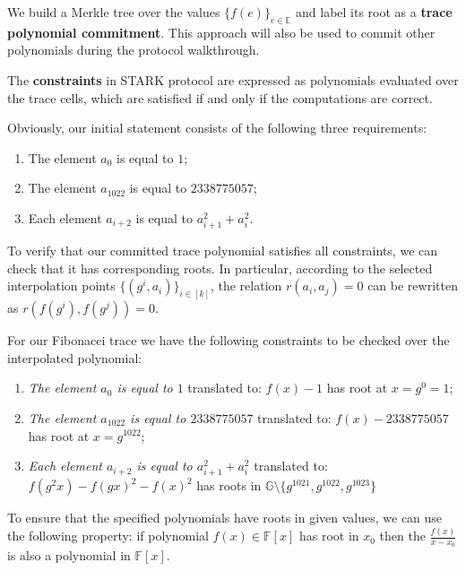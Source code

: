 \documentclass[../lecture-notes.tex]{subfiles}
\begin{document}
We build a Merkle tree over the values $\{f(e)\}_{e \in \mathbb{E}}$ and label
its root as a \textbf{trace polynomial commitment}. This approach will also be
used to commit other polynomials during the protocol walkthrough.

The \textbf{constraints} in STARK protocol are expressed as polynomials
evaluated over the trace cells, which are satisfied if and only if the
computations are correct.

\begin{example}
Obviously, our initial statement consists of the following three requirements:
\begin{enumerate}
    \item The element $a_0$ is equal to $1$;
    \item The element $a_{1022}$ is equal to $2338775057$;
    \item Each element $a_{i+2}$ is equal to $a_{i+1}^2 + a_{i}^2$.
\end{enumerate}
\end{example}
To verify that our committed trace polynomial satisfies all constraints, we can
check that it has corresponding roots. In particular, according to the selected
interpolation points $\{(g^i, a_i)\}_{i \in [k]}$, the relation $r(a_i, a_j) =
0$ can be rewritten as $r(f(g^i), f(g^j)) = 0$.
\begin{example}
For our Fibonacci trace we have the following constraints to be checked over the interpolated polynomial:
\begin{enumerate}
    \item \textit{The element $a_0$ is equal to $1$} translated to: $f(x)-1$ has root at $x = g^0 = 1$;
    \item \textit{The element $a_{1022}$ is equal to $2338775057$} translated to: $f(x) - 2338775057$ has root at $x = g^{1022}$;
    \item \textit{Each element $a_{i+2}$ is equal to $a_{i+1}^2 + a_{i}^2$} translated to: $f(g^2x) - f(gx)^2 - f(x)^2$ has roots in $\mathbb{G} \setminus \{g^{1021}, g^{1022}, g^{1023}\}$
\end{enumerate}
\end{example}

To ensure that the specified polynomials have roots in given values, we can use the following property: if polynomial $f(x) \in \mathbb{F}[x]$ has root in $x_0$ then the $\frac{f(x)}{x - x_0}$ is also a polynomial in $\mathbb{F}[x]$.
\end{document}
